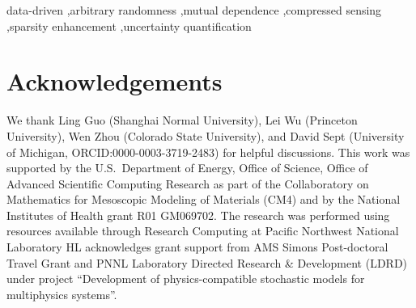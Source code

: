 \documentclass[review]{elsarticle}
\begin{document}
\begin{frontmatter}

\begin{abstract}

\end{abstract}

\begin{keyword}
data-driven \sep arbitrary randomness \sep mutual dependence \sep compressed sensing \sep sparsity enhancement \sep uncertainty quantification 
\end{keyword}

\end{frontmatter}

\linenumbers







\appendix


\section*{Acknowledgements}
We thank %
Ling Guo (Shanghai Normal University), Lei Wu (Princeton University), Wen Zhou (Colorado State University), and David Sept 
(University of Michigan, ORCID:0000-0003-3719-2483) for helpful discussions.
This work was supported by the U.S.\ Department of Energy, Office of Science, Office of Advanced Scientific Computing Research as part of the Collaboratory on Mathematics for Mesoscopic Modeling of Materials (CM4)
and by the National Institutes of Health grant R01 GM069702. The research was performed using resources available through Research Computing at Pacific Northwest National Laboratory
HL acknowledges grant support from AMS Simons Post-doctoral Travel Grant and PNNL Laboratory Directed Research \& Development (LDRD) under project
``Development of physics-compatible stochastic models for multiphysics systems''.



\end{document}
